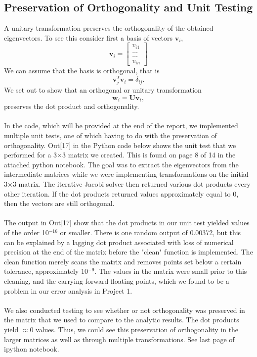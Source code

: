 \documentclass{article}
\begin{document}
\subsection{Preservation of Orthogonality and Unit Testing}
A unitary transformation preserves  the orthogonality of the obtained eigenvectors. To see this consider first a basis of vectors $\mathbf{v}_i$,
\[
\mathbf{v}_i = \begin{bmatrix} v_{i1} \\ \dots \\ \dots \\v_{in} \end{bmatrix}
\]
We can assume that the basis is orthogonal, that is 
\[
\mathbf{v}_j^T\mathbf{v}_i = \delta_{ij}.
\]
We set out to show that an orthogonal or unitary transformation
\[
\mathbf{w}_i=\mathbf{U}\mathbf{v}_i,
\]
preserves the dot product and orthogonality.\\
\\
In the code, which will be provided at the end of the report, we implemented multiple unit tests, one of which having to do with the preservation of orthogonality. Out[17] in the Python code below shows the unit test that we performed for a 3$\times$3 matrix we created. This is found on page 8 of 14 in the attached python notebook. The goal was to extract the eigenvectors from the intermediate matrices while we were implementing transformations on the initial 3$\times$3 matrix. The iterative Jacobi solver then returned various dot products every other iteration. If the dot products returned values approximately equal to 0, then the vectors are still orthogonal.\\
\\
The output in Out[17] show that the dot products in our unit test yielded values of the order 10$^{-16}$ or smaller. There is one random output of 0.00372, but this can be explained by a lagging dot product associated with loss of numerical precision at the end of the matrix before the "clean" function is implemented. The clean function merely scans the matrix and removes points set below a certain tolerance, approximately 10$^{-9}$. The values in the matrix were small prior to this cleaning, and the carrying forward floating points, which we found to be a problem in our error analysis in Project 1.\\
\\
We also conducted testing to see whether or not orthogonality was preserved in the matrix that we used to compare to the analytic results. The dot products yield $\approx0$ values. Thus, we could see this preservation of orthogonality in the larger matrices as well as through multiple transformations. See last page of ipython notebook.\\
\end{document}
